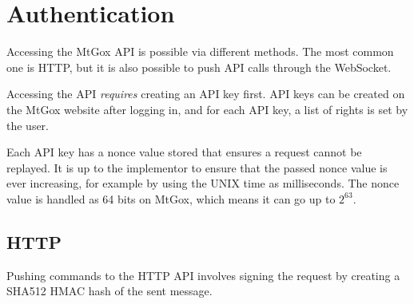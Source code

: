 \section{Authentication}

Accessing the MtGox API is possible via different methods. The most common one
is HTTP, but it is also possible to push API calls through the WebSocket.

Accessing the API \emph{requires} creating an API key first. API keys can be
created on the MtGox website after logging in, and for each API key, a list
of rights is set by the user.

Each API key has a nonce value stored that ensures a request cannot be
replayed. It is up to the implementor to ensure that the passed nonce value is
ever increasing, for example by using the UNIX time as milliseconds. The nonce
value is handled as 64 bits on MtGox, which means it can go up to $2^{63}$.

\subsection{HTTP}

Pushing commands to the HTTP API involves signing the request by creating a
SHA512 HMAC hash of the sent message.


